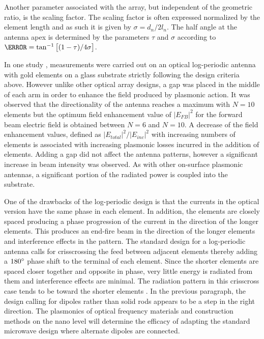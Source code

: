 Another parameter associated with the array, but independent of the geometric ratio, is the scaling factor. The scaling factor is often expressed normalized by the element length and as such it is given by $\sigma  = d_n/ {2 l_n}$. The half angle at the antenna apex is determined by the parameters $\tau$ and $\sigma$ according to $\A  = \tan ^{-1}\left[(1 - \tau)/{4 \sigma} \right]$.

In one study \cite{Pavlov2012}, measurements were carried out on an optical log-periodic antenna with gold elements on a glass substrate strictly following the design criteria above. However unlike other optical array designs, a gap was placed in the middle of each arm in order to enhance the field produced by plasmonic action. It was observed that the directionality of the antenna reaches a maximum with $N = 10$ elements but the optimum field enhancement value of $|E_{FB}|^2$ for the forward beam electric field is obtained between $N = 6$ and $N = 10$. A decrease of the field enhancement values, defined as $|E_{total}|^2/|E_{inc}|^2$ with increasing numbers of elements is associated with increasing plasmonic losses incurred in the addition of elements. Adding a gap did not affect the antenna patterns, however a significant increase in beam intensity was observed. As with other on-surface plasmonic antennas, a significant portion of the radiated power is coupled into the substrate.

One of the drawbacks of the log-periodic design is that the currents in the optical version have the same phase in each element. In addition, the elements are closely spaced producing a phase progression of the current in the direction of the longer elements. This produces an end-fire beam in the direction of the longer elements and interference effects in the pattern. The standard design for a log-periodic antenna calls for crisscrossing the feed between adjacent elements thereby adding a $180\degree$ phase shift to the terminal of each element. Since the shorter elements are spaced closer together and opposite in phase, very little energy is radiated from them and interference effects are minimal. The radiation pattern in this crisscross case tends to be toward the shorter elements \cite{Balanis2015}. In the previous paragraph, the design calling for dipoles rather than solid rods appears to be a step in the right direction. The plasmonics of optical frequency materials and construction methods on the nano level will determine the efficacy of adapting the standard microwave design where alternate dipoles are connected.
